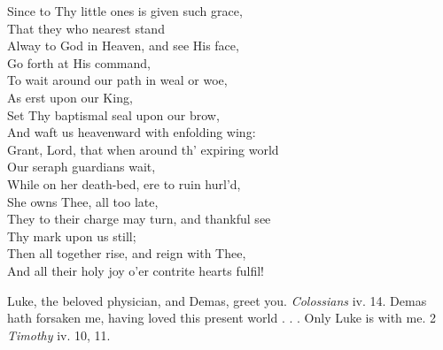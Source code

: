   Since to Thy little ones is given such grace, \\
 That they who nearest stand \\
 Alway to God in Heaven, and see His face, \\
 Go forth at His command, \\
 To wait around our path in weal or woe, \\
 As erst upon our King, \\
 Set Thy baptismal seal upon our brow, \\
 And waft us heavenward with enfolding wing: \\
  Grant, Lord, that when around th’ expiring world \\
 Our seraph guardians wait, \\
 While on her death-bed, ere to ruin hurl’d, \\
 She owns Thee, all too late, \\
 They to their charge may turn, and thankful see \\
 Thy mark upon us still; \\
 Then all together rise, and reign with Thee, \\
 And all their holy joy o’er contrite hearts fulfil!\\


Luke, the beloved physician, and Demas, greet you. \emph{Colossians} iv. 14. Demas hath forsaken me, having loved this present world . . . Only Luke is with me. 2 \emph{Timothy} iv. 10, 11.

